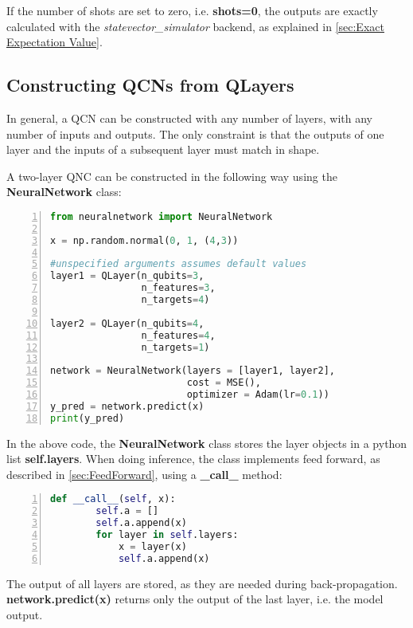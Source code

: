 If the number of shots are set to zero, i.e. \textbf{shots=0}, the outputs are exactly calculated with the \emph{statevector\_simulator} backend, as explained in \autoref{sec:Exact Expectation Value}.

\subsection{Constructing QCNs from QLayers}\label{sec:ConstructingNetworks}
In general, a QCN can be constructed with any number of layers, with any number of inputs and outputs. The only constraint is that the outputs of one layer and the inputs of a subsequent layer must match in shape.

A two-layer QNC can be constructed in the following way using the \textbf{NeuralNetwork} class:

\begin{lstlisting}[language=python, numbers=left]
from neuralnetwork import NeuralNetwork

x = np.random.normal(0, 1, (4,3))

#unspecified arguments assumes default values
layer1 = QLayer(n_qubits=3,
                n_features=3,
                n_targets=4) 
                
layer2 = QLayer(n_qubits=4,
                n_features=4,
                n_targets=1)

network = NeuralNetwork(layers = [layer1, layer2],
                        cost = MSE(),
                        optimizer = Adam(lr=0.1))          
y_pred = network.predict(x)
print(y_pred)
\end{lstlisting}
 
In the above code, the \textbf{NeuralNetwork} class stores the layer objects in a python list \textbf{self.layers}. When doing inference, the class implements feed forward, as described in \autoref{sec:FeedForward}, using a \textbf{\_call\_} method:
\begin{lstlisting}[language=python, numbers=left]
def __call__(self, x):
        self.a = []
        self.a.append(x)
        for layer in self.layers:
            x = layer(x)
            self.a.append(x)
\end{lstlisting}
The output of all layers are stored, as they are needed during back-propagation. \textbf{network.predict(x)} returns only the output of the last layer, i.e. the model output. 

